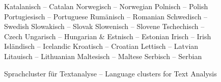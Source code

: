 \documentclass[]{../../metanetpaper}
\begin{document}
\begin{Parallel}[c]{79mm}{78mm}
\begin{figure}
\begin{tabular}
  Katalanisch -- \textcolor{grey4}{Catalan} \newline 
  Norwegisch -- \textcolor{grey4}{Norwegian} \newline 
  Polnisch -- \textcolor{grey4}{Polish} \newline 
  Portugiesisch -- \textcolor{grey4}{Portuguese} \newline 
  Rumänisch -- \textcolor{grey4}{Romanian} \newline 
  Schwedisch -- \textcolor{grey4}{Swedish} \newline 
  Slowakisch -- \textcolor{grey4}{Slovak} \newline 
  Slowenisch -- \textcolor{grey4}{Slovene} \newline 
  Tschechisch -- \textcolor{grey4}{Czech} \newline 
  Ungarisch -- \textcolor{grey4}{Hungarian} 
  & 
  Estnisch -- Estonian \newline 
  Irisch -- Irish \newline 
  Isländisch -- Icelandic \newline 
  Kroatisch -- Croatian \newline 
  Lettisch -- Latvian \newline 
  Litauisch -- Lithuanian \newline 
  Maltesisch -- Maltese \newline 
  Serbisch -- Serbian \\
  \end{tabular}
\label{fig:text_cluster}
\caption{Sprachcluster für Textanalyse -- \textcolor{grey3}{Language clusters for Text Analysis}}
\end{figure}


\end{Parallel}
\end{document}
